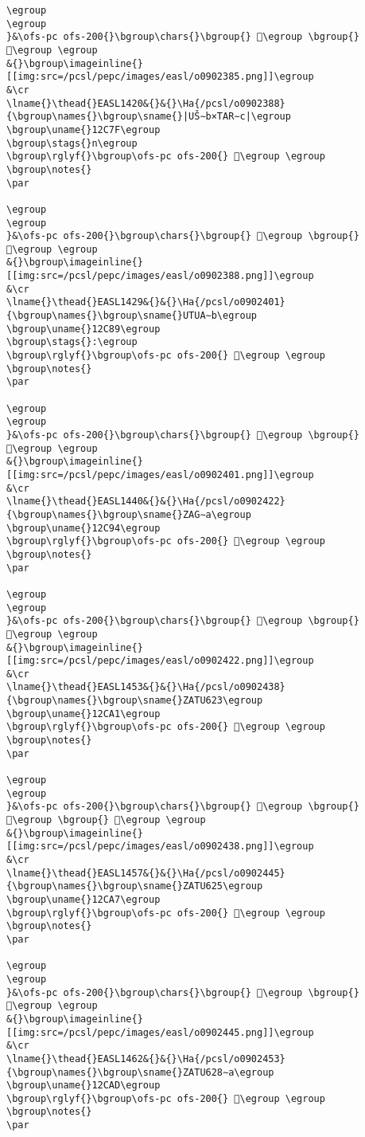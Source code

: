 \begin{verbatim}
\egroup
\egroup
}&\ofs-pc ofs-200{}\bgroup\chars{}\bgroup{} 𒱾\egroup \bgroup{} 𒲁\egroup \egroup
&{}\bgroup\imageinline{}[[img:src=/pcsl/pepc/images/easl/o0902385.png]]\egroup
&\cr
\lname{}\thead{}EASL1420&{}&{}\Ha{/pcsl/o0902388}{\bgroup\names{}\bgroup\sname{}|UŠ∼b×TAR∼c|\egroup
\bgroup\uname{}12C7F\egroup
\bgroup\stags{}n\egroup
\bgroup\rglyf{}\bgroup\ofs-pc ofs-200{} 𒱿\egroup \egroup
\bgroup\notes{}
\par 

\egroup
\egroup
}&\ofs-pc ofs-200{}\bgroup\chars{}\bgroup{} 𒲂\egroup \bgroup{} 𒱿\egroup \egroup
&{}\bgroup\imageinline{}[[img:src=/pcsl/pepc/images/easl/o0902388.png]]\egroup
&\cr
\lname{}\thead{}EASL1429&{}&{}\Ha{/pcsl/o0902401}{\bgroup\names{}\bgroup\sname{}UTUA∼b\egroup
\bgroup\uname{}12C89\egroup
\bgroup\stags{}:\egroup
\bgroup\rglyf{}\bgroup\ofs-pc ofs-200{} 𒲉\egroup \egroup
\bgroup\notes{}
\par 

\egroup
\egroup
}&\ofs-pc ofs-200{}\bgroup\chars{}\bgroup{} 𒲈\egroup \bgroup{} 𒲉\egroup \egroup
&{}\bgroup\imageinline{}[[img:src=/pcsl/pepc/images/easl/o0902401.png]]\egroup
&\cr
\lname{}\thead{}EASL1440&{}&{}\Ha{/pcsl/o0902422}{\bgroup\names{}\bgroup\sname{}ZAG∼a\egroup
\bgroup\uname{}12C94\egroup
\bgroup\rglyf{}\bgroup\ofs-pc ofs-200{} 𒲔\egroup \egroup
\bgroup\notes{}
\par 

\egroup
\egroup
}&\ofs-pc ofs-200{}\bgroup\chars{}\bgroup{} 𒲓\egroup \bgroup{} 𒲔\egroup \egroup
&{}\bgroup\imageinline{}[[img:src=/pcsl/pepc/images/easl/o0902422.png]]\egroup
&\cr
\lname{}\thead{}EASL1453&{}&{}\Ha{/pcsl/o0902438}{\bgroup\names{}\bgroup\sname{}ZATU623\egroup
\bgroup\uname{}12CA1\egroup
\bgroup\rglyf{}\bgroup\ofs-pc ofs-200{} 𒲡\egroup \egroup
\bgroup\notes{}
\par 

\egroup
\egroup
}&\ofs-pc ofs-200{}\bgroup\chars{}\bgroup{} 𒲣\egroup \bgroup{} 𒲢\egroup \bgroup{} 𒲡\egroup \egroup
&{}\bgroup\imageinline{}[[img:src=/pcsl/pepc/images/easl/o0902438.png]]\egroup
&\cr
\lname{}\thead{}EASL1457&{}&{}\Ha{/pcsl/o0902445}{\bgroup\names{}\bgroup\sname{}ZATU625\egroup
\bgroup\uname{}12CA7\egroup
\bgroup\rglyf{}\bgroup\ofs-pc ofs-200{} 𒲧\egroup \egroup
\bgroup\notes{}
\par 

\egroup
\egroup
}&\ofs-pc ofs-200{}\bgroup\chars{}\bgroup{} 𒲧\egroup \bgroup{} 𒲨\egroup \egroup
&{}\bgroup\imageinline{}[[img:src=/pcsl/pepc/images/easl/o0902445.png]]\egroup
&\cr
\lname{}\thead{}EASL1462&{}&{}\Ha{/pcsl/o0902453}{\bgroup\names{}\bgroup\sname{}ZATU628∼a\egroup
\bgroup\uname{}12CAD\egroup
\bgroup\rglyf{}\bgroup\ofs-pc ofs-200{} 𒲭\egroup \egroup
\bgroup\notes{}
\par 


\end{verbatim}
